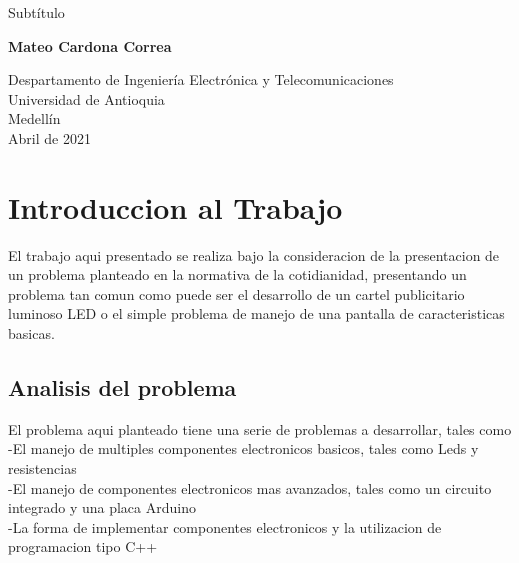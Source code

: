 \documentclass{article}
\begin{document}
\begin{titlepage}
    \begin{center}
        \vspace*{1cm}
            
        \Huge
        \textbf{}
            
        \vspace{0.5cm}
        \LARGE
        Subtítulo
            
        \vspace{1.5cm}
            
        \textbf{Mateo Cardona Correa}
            
        \vfill
            
        \vspace{0.8cm}
            
        \Large
        Despartamento de Ingeniería Electrónica y Telecomunicaciones\\
        Universidad de Antioquia\\
        Medellín\\
        Abril de 2021
            
    \end{center}
\end{titlepage}

\tableofcontents
\newpage
\section{Introduccion al Trabajo}\label{intro}
El trabajo aqui presentado se realiza bajo la consideracion de la presentacion de un problema planteado en la normativa de la cotidianidad, presentando un problema tan comun como puede ser el desarrollo de un cartel publicitario luminoso LED o el simple problema de manejo de una pantalla de caracteristicas basicas.

\subsection{Analisis del problema}\label{}
El problema aqui planteado tiene una serie de problemas a desarrollar, tales como\\
    -El manejo de multiples componentes electronicos basicos, tales como Leds y resistencias\\
    -El manejo de componentes electronicos mas avanzados, tales como un circuito integrado y una placa Arduino\\
    -La forma de implementar componentes electronicos y la utilizacion de programacion tipo C++
\end{document}
